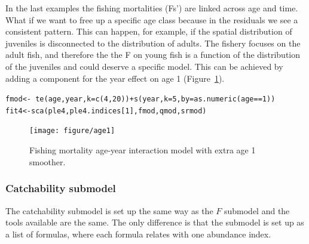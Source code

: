 \documentclass[a4paper,english,10pt]{article}\usepackage[]{graphicx}\usepackage[]{color}
\makeatletter
\newcommand{\hlnum}[1]{\textcolor[rgb]{0.2,0.2,0.2}{#1}}%
\newcommand{\hlopt}[1]{\textcolor[rgb]{0.2,0.2,0.2}{#1}}%
\newcommand{\hlstd}[1]{\textcolor[rgb]{0,0,0}{#1}}%
\newcommand{\hlkwb}[1]{\textcolor[rgb]{0.361,0.506,0.596}{#1}}%
\newcommand{\hlkwc}[1]{\textcolor[rgb]{0.361,0.506,0.596}{#1}}%
\newcommand{\hlkwd}[1]{\textcolor[rgb]{0.361,0.506,0.596}{#1}}%
\newenvironment{kframe}{%
 \def\at@end@of@kframe{}%
 \ifinner\ifhmode%
  \def\at@end@of@kframe{\end{minipage}}%
  \begin{minipage}{\columnwidth}%
 \fi\fi%
 \def\FrameCommand##1{\hskip\@totalleftmargin \hskip-\fboxsep
 \colorbox{shadecolor}{##1}\hskip-\fboxsep
     \hskip-\linewidth \hskip-\@totalleftmargin \hskip\columnwidth}%
 \MakeFramed {\advance\hsize-\width
   \@totalleftmargin\z@ \linewidth\hsize
   \@setminipage}}%
 {\par\unskip\endMakeFramed%
 \at@end@of@kframe}
\newenvironment{knitrout}{}{} %
\makeatother
\begin{document}
In the last examples the fishing mortalities (Fs') are linked across age and time.  What if we want to free up a specific age class because in the residuals we see a consistent pattern.  This can happen, for example, if the spatial distribution of juveniles is disconnected to the distribution of adults.  The fishery focuses on the adult fish, and therefore the the F on young fish is a function of the distribution of the juveniles and could deserve a specific model. This can be achieved by adding a component for the year effect on age 1 (Figure~\ref{fig:age1}).

\begin{knitrout}
\color{fgcolor}\begin{kframe}
\begin{alltt}
\hlstd{fmod} \hlkwb{<-} \hlopt{~} \hlkwd{te}\hlstd{(age, year,} \hlkwc{k} \hlstd{=} \hlkwd{c}\hlstd{(}\hlnum{4}\hlstd{,}\hlnum{20}\hlstd{))} \hlopt{+} \hlkwd{s}\hlstd{(year,} \hlkwc{k} \hlstd{=} \hlnum{5}\hlstd{,} \hlkwc{by} \hlstd{=} \hlkwd{as.numeric}\hlstd{(age}\hlopt{==}\hlnum{1}\hlstd{))}
\hlstd{fit4} \hlkwb{<-} \hlkwd{sca}\hlstd{(ple4, ple4.indices[}\hlnum{1}\hlstd{], fmod, qmod, srmod)}
\end{alltt}
\end{kframe}
\end{knitrout}

\begin{knitrout}
\color{fgcolor}\begin{figure}[H]


{\centering \texttt{[image: figure/age1]} 

}

\caption[Fishing mortality age-year interaction model with extra age 1 smoother]{Fishing mortality age-year interaction model with extra age 1 smoother.\label{fig:age1}}
\end{figure}


\end{knitrout}

\subsubsection{Catchability submodel}

The catchability submodel is set up the same way as the $F$ submodel and the tools available are the same. The only difference is that the submodel is set up as a list of formulas, where each formula relates with one abundance index.
\end{document}
